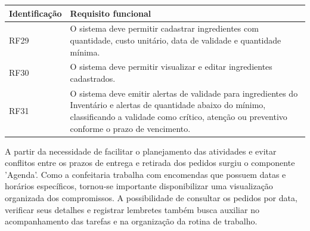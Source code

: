 \begin{quadro}
    \centering
    \label{quadro:rf_inventario}

    \begin{tabular}{|p{3cm}|p{11cm}|}
        \hline
        \textbf{Identificação} & \textbf{Requisito funcional} \\ \hline

        RF29 & O sistema deve permitir cadastrar ingredientes com quantidade, custo unitário, data de validade e quantidade mínima. \\ \hline

        RF30 & O sistema deve permitir visualizar e editar ingredientes cadastrados. \\ \hline

        RF31 & O sistema deve emitir alertas de validade para ingredientes do Inventário e alertas de quantidade abaixo do mínimo, classificando a validade como crítico, atenção ou preventivo conforme o prazo de vencimento. \\ \hline 
    \end{tabular}

    \vspace{0.2cm}
\end{quadro}


A partir da necessidade de facilitar o planejamento das atividades e evitar conflitos entre os prazos de entrega e retirada dos pedidos surgiu o componente 'Agenda'. Como a confeitaria trabalha com encomendas que possuem datas e horários específicos, tornou-se importante disponibilizar uma visualização organizada dos compromissos. A possibilidade de consultar os pedidos por data, verificar seus detalhes e registrar lembretes também busca auxiliar no acompanhamento das tarefas e na organização da rotina de trabalho.

